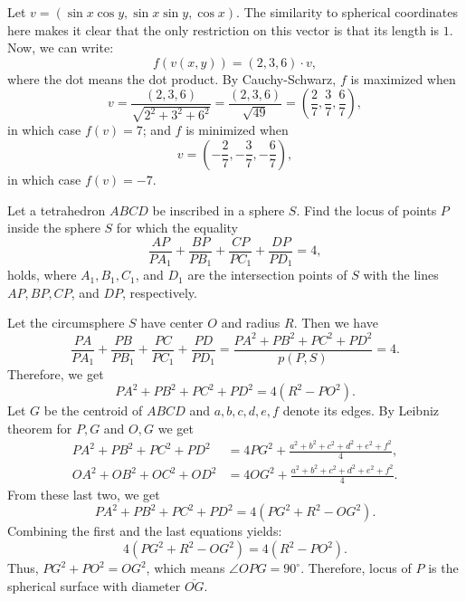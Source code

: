 \documentclass[12pt,a4paper]{memoir}
\theoremstyle{definition}
\begin{document}
\begin{solution}[name={Solution by Facis}] 
	Let $v = (\sin x \cos y, \sin x \sin y, \cos x)$. The similarity to spherical coordinates here makes it clear that the only restriction on this vector is that its length is $1$. Now, we can write:
	\[f(v(x,y)) = (2,3,6) \cdot v,\]
	where the dot means the dot product. By Cauchy-Schwarz, $f$ is maximized when \[v = \frac{(2,3,6)}{\sqrt{2^2+3^2+6^2}} =\frac{(2,3,6) }{ \sqrt{49}} = \left(\frac 27, \frac 37, \frac 67\right),\] in which case $f(v) = 7$; and $f$ is minimized when \[v = \left(-\frac 27, -\frac 37, -\frac 67\right),\] in which case $f(v) = -7$.
\end{solution}





\begin{question}
	Let a tetrahedron $ABCD$ be inscribed in a sphere $S$. Find the locus of points $P$ inside the sphere $S$ for which the equality
	\[\frac{AP}{PA_1}+\frac{BP}{PB_1}+\frac{CP}{PC_1}+\frac{DP}{PD_1}=4,\]
	holds, where $A_1,B_1, C_1$, and $D_1$ are the intersection points of $S$ with the lines $AP,BP,CP$, and $DP$, respectively.
\end{question}





\begin{solution}[name={Solution by Luis González}] 
	Let the circumsphere $S$ have center $O$ and radius $R.$ Then we have
	\[\frac{PA}{PA_1}+\frac{PB}{PB_1}+\frac{PC}{PC_1}+\frac{PD}{PD_1}=\frac{PA^2+PB^2+PC^2+PD^2}{p(P,S)}=4.\]
	Therefore, we get 
	$$ PA^2+PB^2+PC^2+PD^2=4(R^2-PO^2).$$
	Let $G$ be the centroid of $ABCD$ and $a,b,c,d,e,f$ denote its edges. By Leibniz theorem for $P,G$ and $O,G$ we get
	\begin{align*}
		PA^2+PB^2+PC^2+PD^2 &= 4PG^2+\frac{a^2+b^2+c^2+d^2+e^2+f^2}{4},\\
		OA^2+OB^2+OC^2+OD^2 & =4OG^2+\frac{a^2+b^2+c^2+d^2+e^2+f^2}{4}.
	\end{align*}
	From these last two, we get \[PA^2+PB^2+PC^2+PD^2=4(PG^2+R^2-OG^2).\]
	Combining the first and the last equations yields: $$4(PG^2+R^2-OG^2)=4(R^2-PO^2).$$
	Thus, $ PG^2+PO^2=OG^2$, which means $\angle OPG=90^{\circ}$. Therefore, locus of $P$ is the spherical surface with diameter $\overline{OG}$.
\end{solution}
\end{document}

